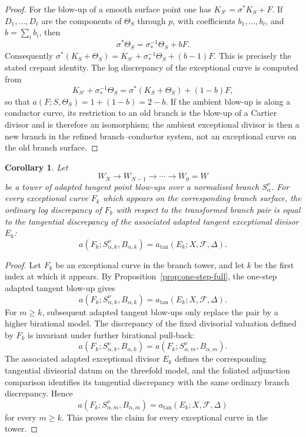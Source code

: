 \documentclass[11pt]{amsart}
\numberwithin{equation}{section}
\theoremstyle{plain}
\newtheorem{Corollary}[Theorem]{Corollary}
\theoremstyle{definition}
\newcommand{\cF}{\mathcal F}
\begin{document}
\begin{proof}
For the blow-up of a smooth surface point one has
$
K_{S'}=\sigma^*K_S+F.
$
If $D_1,\ldots,D_\ell$ are the components of $\Theta_S$ through $p$, with coefficients $b_1,\ldots,b_\ell$, and $b=\sum_i b_i$, then
\[
\sigma^*\Theta_S=\sigma^{-1}_*\Theta_S+bF.
\]
Consequently
$
\sigma^*(K_S+\Theta_S)
=K_{S'}+\sigma^{-1}_*\Theta_S+(b-1)F.
$
This is precisely the stated crepant identity.
The log discrepancy of the exceptional curve is computed from
\[
K_{S'}+\sigma^{-1}_*\Theta_S
=\sigma^*(K_S+\Theta_S)+(1-b)F,
\]
so that $a(F;S,\Theta_S)=1+(1-b)=2-b$.  If the ambient blow-up is along a conductor curve, its restriction to an old branch is the blow-up of a Cartier divisor and is therefore an isomorphism; the ambient exceptional divisor is then a new branch in the refined branch--conductor system, not an exceptional curve on the old branch surface.
\end{proof}

\begin{Corollary}
\label{cor:iterated-branch-discrepancy}
Let
\[
W_N\longrightarrow W_{N-1}\longrightarrow\cdots\longrightarrow W_0=W
\]
be a tower of adapted tangent point blow-ups over a normalised branch
\(S_\alpha^\nu\).  For every exceptional curve \(F_k\) which appears on the
corresponding branch surface, the ordinary log discrepancy of \(F_k\) with
respect to the transformed branch pair is equal to the tangential discrepancy
of the associated adapted tangent exceptional divisor \(E_k\):
\[
a(F_k;S_{\alpha,k}^{\nu},B_{\alpha,k})
=
a_{\tan}(E_k;X,\cF,\Delta).
\]
\end{Corollary}

\begin{proof}
Let \(F_k\) be an exceptional curve in the branch tower, and let \(k\) be the
first index at which it appears.  By Proposition~\ref{prop:one-step-full},
the one-step adapted tangent blow-up gives
\[
a(F_k;S_{\alpha,k}^{\nu},B_{\alpha,k})
=
a_{\tan}(E_k;X,\cF,\Delta).
\]
For \(m\geq k\), subsequent adapted tangent blow-ups only replace the pair by
a higher birational model.  The discrepancy of the fixed divisorial valuation
defined by \(F_k\) is invariant under further birational pull-back:
\[
a(F_k;S_{\alpha,k}^{\nu},B_{\alpha,k})
=
a(F_k;S_{\alpha,m}^{\nu},B_{\alpha,m}).
\]
The associated adapted exceptional divisor \(E_k\) defines the corresponding
tangential divisorial datum on the threefold model, and the foliated
adjunction comparison identifies its tangential discrepancy with the same
ordinary branch discrepancy.  Hence
\[
a(F_k;S_{\alpha,m}^{\nu},B_{\alpha,m})
=
a_{\tan}(E_k;X,\cF,\Delta)
\]
for every \(m\geq k\).  This proves the claim for every exceptional curve in
the tower.
\end{proof}
\end{document}
